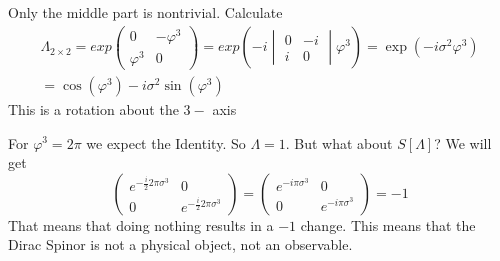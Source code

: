 \documentclass[]{scrartcl}
\begin{document}
Only the middle part is nontrivial. Calculate
\begin{gather}
	\Lambda_{2\times2} = exp
	\begin{pmatrix}
		0 & -\varphi^3 \\ \varphi^3 & 0
	\end{pmatrix}
	= exp
	\left(-i 
	\begin{vmatrix}
		0 & -i \\ i & 0 %
	\end{vmatrix}
	\varphi^3
	\right)
	= \exp(-i\sigma^2\varphi^3)\\
	= \cos(\varphi^3) - i\sigma^2\sin(\varphi^3)
	\end{gather}
This is a rotation about the $3-$ axis

For $\varphi^3 = 2\pi$ we expect the Identity. So $\Lambda = 1$.
But what about $S[\Lambda]$? We will get
\begin{equation}
	\begin{pmatrix}
		e^{-\frac{i}{2}2\pi\sigma^3} & 0\\
		0 & e^{-\frac{i}{2}2\pi\sigma^3}
	\end{pmatrix}=
	\begin{pmatrix}
		e^{-i\pi\sigma^3} & 0\\
		0 & e^{-i\pi\sigma^3}
	\end{pmatrix}=
	-1
\end{equation}
That means that doing nothing results in a $-1$ change. This means that the Dirac Spinor is not a physical object, not an observable.
\end{document}
